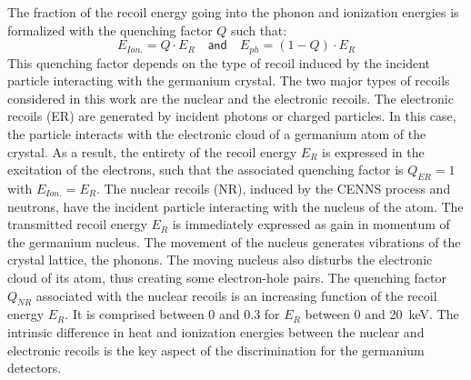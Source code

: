 The fraction of the recoil energy going into the phonon and ionization energies is formalized with the quenching factor $Q$ such that:
\begin{equation}
\label{eq:quenching-intro}
E_{Ion.} = Q \cdot E_R \quad \textsf{and} \quad E_{ph} = (1-Q) \cdot E_R
\end{equation}
This quenching factor depends on the type of recoil induced by the incident particle interacting with the germanium crystal. The two major types of recoils considered in this work are the nuclear and the electronic recoils.
The electronic recoils (ER) are generated by incident photons or charged particles. In this case, the particle interacts with the electronic cloud of a germanium atom of the crystal. As a result, the entirety of the recoil energy $E_R$ is expressed in the excitation of the electrons, such that the associated quenching factor is $Q_{ER} = 1$ with $E_{Ion.} = E_R$.
The nuclear recoils (NR), induced by the CENNS process and neutrons, have the incident particle interacting with the nucleus of the atom. The transmitted recoil energy $E_R$ is immediately expressed as gain in momentum of the germanium nucleus. The movement of the nucleus generates vibrations of the crystal lattice, the phonons. The moving nucleus also disturbs the electronic cloud of its atom, thus creating some electron-hole pairs. The quenching factor $Q_{NR}$ associated with the nuclear recoils is an increasing function of the recoil energy $E_R$. It is comprised between 0 and 0.3 for $E_R$ between 0 and \SI{20}{\kilo\eV}.
The intrinsic difference in heat and ionization energies between the nuclear and electronic recoils is the key aspect of the discrimination for the germanium detectors.

